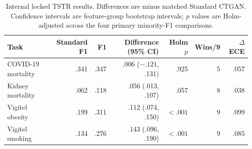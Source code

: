 \begin{table}[htbp]
\centering
\caption{Internal locked TSTR results. Differences are \sepa{} minus matched Standard CTGAN. Confidence intervals are feature-group bootstrap intervals; $p$ values are Holm-adjusted across the four primary minority-F1 comparisons.}
\label{tab:locked-primary}
\small
\begin{tabularx}{\textwidth}{Xrrrrrr}
\toprule
Task & Standard F1 & \sepa{} F1 & Difference (95\% CI) & Holm $p$ & Wins/9 & $\Delta$ECE\\
\midrule
COVID-19 mortality & .341 & .347 & .006 ($-.121$, .131) & .925 & 5 & .057\\
Kidney mortality & .062 & .118 & .056 (.013, .107) & .057 & 8 & .038\\
Vigitel obesity & .199 & .311 & .112 (.074, .150) & $<.001$ & 9 & .099\\
Vigitel smoking & .134 & .276 & .143 (.096, .190) & $<.001$ & 9 & .085\\
\bottomrule
\end{tabularx}
\end{table}
